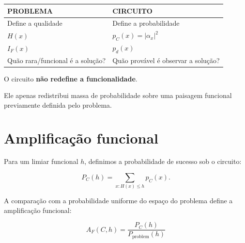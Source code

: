 \documentclass[11pt,a4paper]{article}
\begin{document}
\begin{center}

\renewcommand{\arraystretch}{1.4}

\begin{tabularx}{0.94\textwidth}{
    >{\centering\arraybackslash}X
    >{\centering\arraybackslash}X
}

\toprule

\textbf{PROBLEMA}
&
\textbf{CIRCUITO}
\\

\midrule

Define a qualidade
&
Define a probabilidade
\\

$H(x)$
&
$p_C(x)=|\alpha_x|^2$
\\

$I_F(x)$
&
$p_d(x)$
\\

Quão rara/funcional é a solução?
&
Quão provável é observar a solução?
\\

\bottomrule

\end{tabularx}

\end{center}

\begin{mainidea}

O circuito \textbf{não redefine a funcionalidade}.

Ele apenas redistribui massa de probabilidade sobre uma
paisagem funcional previamente definida pelo problema.

\end{mainidea}

\section{Amplificação funcional}

Para um limiar funcional $h$, definimos a probabilidade de sucesso
sob o circuito:

\[
P_C(h)
=
\sum_{x:H(x)\leq h}p_C(x).
\]

A comparação com a probabilidade uniforme do espaço do problema
define a amplificação funcional:

\begin{definitionbox}

\[
\boxed{
A_F(C,h)
=
\frac{
P_C(h)
}{
P_{\mathrm{problem}}(h)
}
}
\]

\end{definitionbox}
\end{document}
